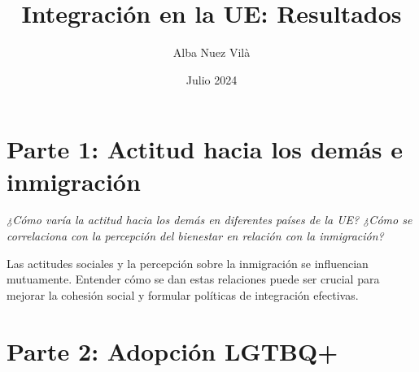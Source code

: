 \documentclass{article}
\title{Integración en la UE: Resultados}
\author{Alba Nuez Vilà}
\date{Julio 2024}
\begin{document}

\maketitle

\section{Parte 1: Actitud hacia los demás e inmigración}

\begin{center}
\emph{¿Cómo varía la actitud hacia los demás en diferentes países de la UE? ¿Cómo se correlaciona con la percepción del bienestar en relación con la inmigración?}
\end{center}

Las actitudes sociales y la percepción sobre la inmigración se influencian mutuamente. Entender cómo se dan estas relaciones puede ser crucial para mejorar la cohesión social y formular políticas de integración efectivas.

\section{Parte 2: Adopción LGTBQ+}

\end{document}
